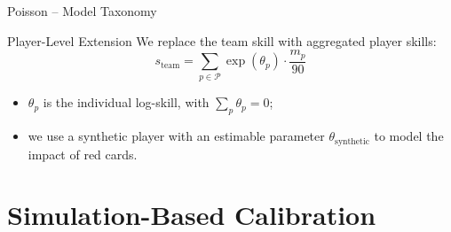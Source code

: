 \documentclass{beamer}
\def\\{}%
\begin{document}
\begin{frame}{Poisson -- Model Taxonomy}
\begin{center}
{%
    }
    \end{center}
\end{frame}

\begin{frame}{Player-Level Extension}
    We replace the team skill with aggregated player skills:
    \begin{equation*}
        s_{\text{team}} = \sum_{p \in \mathcal{P}} \exp(\theta_p) \cdot \frac{m_p}{90}
    \end{equation*}

    \begin{itemize}
        \item $\theta_p$ is the individual log-skill, with $\sum_p \theta_p = 0$;

        \item we use a synthetic player with an estimable parameter $\theta_{\text{synthetic}}$ to model the impact of red cards.
    \end{itemize}
\end{frame}

\section{Simulation-Based Calibration}
\end{document}
